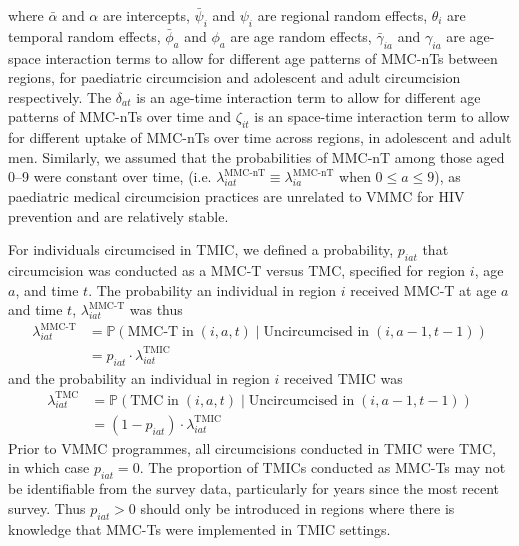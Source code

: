\documentclass{article}
\begin{document}
\begin{appendix}
where $\bar{\alpha}$ and $\alpha$ are intercepts, $\bar{\psi}_i$ and $\psi_i$ are regional random effects, $\theta_i$ are temporal random effects, $\bar{\phi}_a$ and $\phi_a$ are age random effects, $\bar{\gamma}_{ia}$ and $\gamma_{ia}$ are age-space interaction terms to allow for different age patterns of MMC-nTs between regions, for paediatric circumcision and adolescent and adult circumcision respectively. The $\delta_{at}$ is an age-time interaction term to allow for different age patterns of MMC-nTs over time and $\zeta_{it}$ is an space-time interaction term to allow for different uptake of MMC-nTs over time across regions, in adolescent and adult men. Similarly, we assumed that the probabilities of MMC-nT among those aged 0--9 were constant over time, (i.e. $\lambda^{\text{MMC-nT}}_{iat} \equiv \lambda^{\text{MMC-nT}}_{ia}$ when $0\leq a \leq 9$), as paediatric medical circumcision practices are unrelated to VMMC for HIV prevention and are relatively stable. 

\noindent For individuals circumcised in TMIC, we defined a probability, $p_{iat}$ that circumcision was conducted as a MMC-T versus TMC, specified for region $i$, age $a$, and time $t$. The probability an individual in region $i$ received MMC-T at age $a$ and time $t$, $\lambda^{\text{MMC-T}}_{iat}$ was thus 
\begin{equation}
	\begin{split}
		\lambda^{\text{MMC-T}}_{iat} &= \mathbb{P}(\text{MMC-T} \; \text{in} \; (i,a,t) \; | \; \text{Uncircumcised in} \; (i,a-1, t-1)) \\
		&=p_{iat}\cdot\lambda^{\text{TMIC}}_{iat}
	\end{split}
	\label{eqn::mmct}
\end{equation}
and  the probability an individual in region $i$ received TMIC was
\begin{equation}
	\begin{split}
		\lambda^{\text{TMC}}_{iat} &= \mathbb{P}(\text{TMC} \; \text{in} \; (i,a,t) \; | \; \text{Uncircumcised in} \; (i,a-1, t-1)) \\
		&=(1-p_{iat})\cdot\lambda^{\text{TMIC}}_{iat}
	\end{split}
	\label{eqn::tmc}
\end{equation}
Prior to VMMC programmes, all circumcisions conducted in TMIC were TMC, in which case $p_{iat}=0$. The proportion of TMICs conducted as MMC-Ts may not be identifiable from the survey data, particularly for years since the most recent survey. Thus $p_{iat}>0$ should only be introduced in regions where there is knowledge that MMC-Ts were implemented in TMIC settings. 


\end{appendix}
\end{document}
